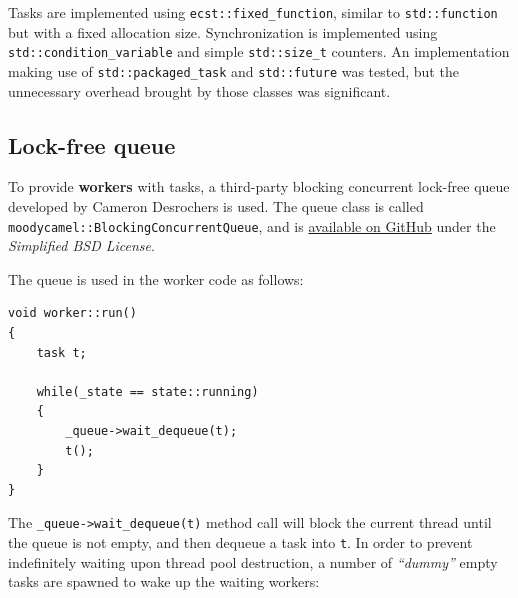 \documentclass[oneside, 12pt, a4paper, openany]{book}
\begin{document}
Tasks are implemented using
\texttt{ecst::fixed_function},
similar to
\texttt{std::function}
but with a fixed allocation size. Synchronization is implemented using
\texttt{std::condition_variable}
and simple
\texttt{std::size_t}
counters. An implementation making use of
\texttt{std::packaged_task}
and
\texttt{std::future}
was tested, but the unnecessary overhead brought by those classes was
significant.

\subsection{Lock-free queue}\label{lock-free-queue}

To provide \textbf{workers} with tasks, a third-party blocking
concurrent lock-free queue developed by Cameron Desrochers is used. The
queue class is called
\texttt{moodycamel::BlockingConcurrentQueue},
and is \href{https://github.com/cameron314/concurrentqueue}{available on
GitHub} under the \emph{Simplified BSD License}.

The queue is used in the worker code as follows:

\begin{verbatim}
void worker::run()
{
    task t;

    while(_state == state::running)
    {
        _queue->wait_dequeue(t);
        t();
    }
}
\end{verbatim}

The
\texttt{_queue->wait_dequeue(t)}
method call will block the current thread until the queue is not empty,
and then dequeue a task into
\texttt{t}.
In order to prevent indefinitely waiting upon thread pool destruction, a
number of \emph{``dummy''} empty tasks are spawned to wake up the
waiting workers:
\end{document}

